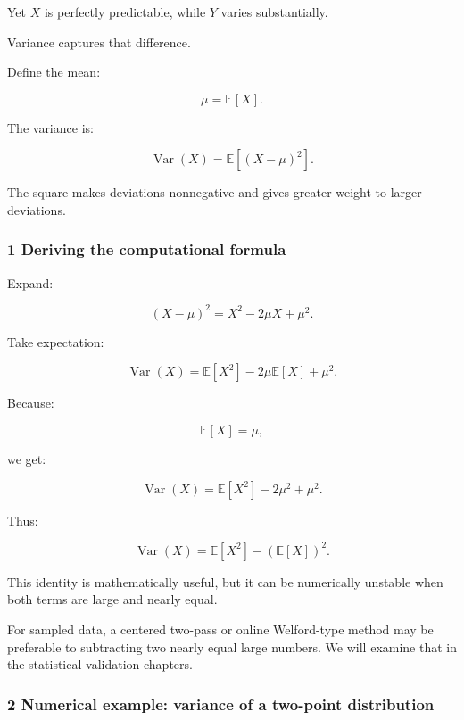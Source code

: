 Yet \(X\) is perfectly predictable, while \(Y\) varies substantially.

Variance captures that difference.

Define the mean:

\[
 \mu=\mathbb E[X].
\]

The variance is:

\[
 \boxed{ \operatorname{Var}(X)= \mathbb E[(X-\mu)^2] }.
\]

The square makes deviations nonnegative and gives greater weight to larger deviations.

\subsubsection{1 Deriving the computational formula}\label{02-foundations-ii-ch023-deriving-the-computational-formula}

\hypertarget{02-foundations-ii-ch023-deriving-the-computational-formula}{}

Expand:

\[
 (X-\mu)^2=X^2-2\mu X+\mu^2.
\]

Take expectation:

\[
 \operatorname{Var}(X) = \mathbb E[X^2] -2\mu\mathbb E[X] +\mu^2.
\]

Because:

\[
 \mathbb E[X]=\mu,
\]

we get:

\[
 \operatorname{Var}(X) = \mathbb E[X^2]-2\mu^2+\mu^2.
\]

Thus:

\[
 \boxed{ \operatorname{Var}(X)= \mathbb E[X^2]-(\mathbb E[X])^2 }.
\]

This identity is mathematically useful, but it can be numerically unstable when both terms are large and nearly equal.

For sampled data, a centered two-pass or online Welford-type method may be preferable to subtracting two nearly equal large numbers. We will examine that in the statistical validation chapters.

\subsubsection{2 Numerical example: variance of a two-point distribution}\label{02-foundations-ii-ch023-numerical-example-variance-of-a-two-point-distribution}

\hypertarget{02-foundations-ii-ch023-numerical-example-variance-of-a-two-point-distribution}{}

